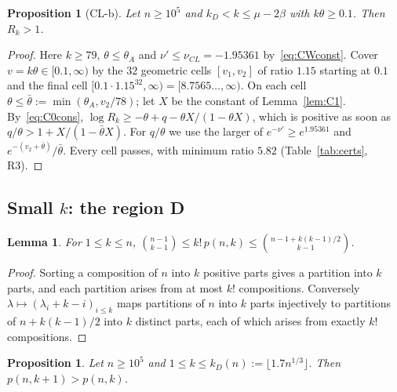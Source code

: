 \documentclass[11pt]{amsart}
\newtheorem{lemma}[theorem]{Lemma}
\newtheorem{proposition}[theorem]{Proposition}
\theoremstyle{definition}
\theoremstyle{remark}
\numberwithin{equation}{section}
\begin{document}
\begin{proposition}[CL-b]\label{prop:CLb}
Let $n\ge10^5$ and $k_D<k\le\mu-2\beta$ with $k\theta\ge0.1$. Then $R_k>1$.
\end{proposition}

\begin{proof}
Here $k\ge79$, $\theta\le\theta_A$ and $\nu'\le\nu_{CL}=-1.95361$ by~\eqref{eq:CWconst}. Cover $v=k\theta\in[0.1,\infty)$ by the $32$ geometric
cells $[v_1,v_2]$ of ratio $1.15$ starting at $0.1$ and the final cell $[0.1\cdot1.15^{32},\infty)=[8.7565\ldots,\infty)$. On each cell $\theta\le\bar\theta:=\min(\theta_A,v_2/78)$; let
$X$ be the constant of Lemma~\ref{lem:C1}. By~\eqref{eq:C0cons}, $\log R_k\ge-\theta+q-\theta X/(1-\theta X)$, which is positive as soon as
$q/\theta>1+X/(1-\bar\theta X)$. For $q/\theta$ we use the larger of $e^{-\nu'}\ge e^{1.95361}$ and $e^{-(v_2+\bar\theta)}/\bar\theta$. Every
cell passes, with minimum ratio $5.82$ (Table~\ref{tab:certs}, R3).
\end{proof}

\subsection{Small \texorpdfstring{$k$}{k}: the region D}\label{sec:D}
\begin{lemma}\label{lem:D1}
For $1\le k\le n$, $\binom{n-1}{k-1}\le k!\,p(n,k)\le\binom{n-1+k(k-1)/2}{k-1}$.
\end{lemma}

\begin{proof}
Sorting a composition of $n$ into $k$ positive parts gives a partition into $k$ parts, and each partition arises from at most $k!$
compositions. Conversely $\lambda\mapsto(\lambda_i+k-i)_{i\le k}$ maps partitions of $n$ into $k$ parts injectively to partitions of
$n+k(k-1)/2$ into $k$ distinct parts, each of which arises from exactly $k!$ compositions.
\end{proof}

\begin{proposition}\label{prop:D}
Let $n\ge10^5$ and $1\le k\le k_D(n):=\lfloor1.7n^{1/3}\rfloor$. Then $p(n,k+1)>p(n,k)$.
\end{proposition}
\end{document}
